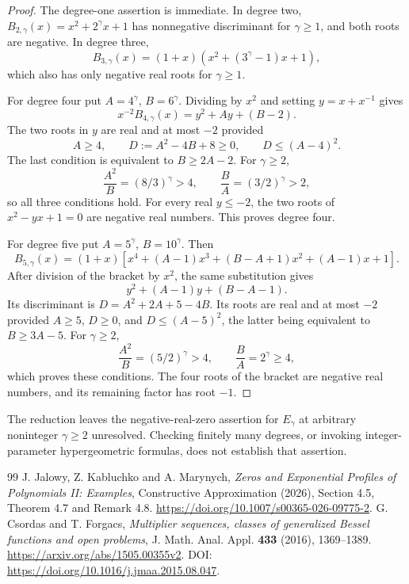 \documentclass[11pt,a4paper]{article}
\theoremstyle{remark}
\begin{document}
\begin{proof}
The degree-one assertion is immediate.  In degree two,
$B_{2,\gamma}(x)=x^2+2^\gamma x+1$ has nonnegative discriminant for
$\gamma\ge1$, and both roots are negative.  In degree three,
\[
 B_{3,\gamma}(x)=(1+x)\left(x^2+(3^\gamma-1)x+1\right),
\]
which also has only negative real roots for $\gamma\ge1$.

For degree four put $A=4^\gamma$, $B=6^\gamma$.  Dividing by $x^2$
and setting $y=x+x^{-1}$ gives
\[
 x^{-2}B_{4,\gamma}(x)=y^2+Ay+(B-2).
\]
The two roots in $y$ are real and at most $-2$ provided
\[
 A\ge4,\qquad D:=A^2-4B+8\ge0,
 \qquad D\le(A-4)^2.
\]
The last condition is equivalent to $B\ge2A-2$.  For $\gamma\ge2$,
\[
 \frac{A^2}{B}=(8/3)^\gamma>4,
 \qquad \frac BA=(3/2)^\gamma>2,
\]
so all three conditions hold.  For every real $y\le-2$, the two roots
of $x^2-yx+1=0$ are negative real numbers.  This proves degree four.

For degree five put $A=5^\gamma$, $B=10^\gamma$.  Then
\[
 B_{5,\gamma}(x)
 =(1+x)\left[x^4+(A-1)x^3+(B-A+1)x^2+(A-1)x+1\right].
\]
After division of the bracket by $x^2$, the same substitution gives
\[
 y^2+(A-1)y+(B-A-1).
\]
Its discriminant is $D=A^2+2A+5-4B$.  Its roots are real and at most
$-2$ provided $A\ge5$, $D\ge0$, and
$D\le(A-5)^2$, the latter being equivalent to $B\ge3A-5$.
For $\gamma\ge2$,
\[
 \frac{A^2}{B}=(5/2)^\gamma>4,
 \qquad \frac BA=2^\gamma\ge4,
\]
which proves these conditions.  The four roots of the bracket are
negative real numbers, and its remaining factor has root $-1$.
\end{proof}

The reduction leaves the negative-real-zero assertion for $E_\gamma$
at arbitrary noninteger $\gamma\ge2$ unresolved.  Checking finitely many
degrees, or invoking integer-parameter hypergeometric formulas, does not
establish that assertion.

\begingroup\small
\begin{thebibliography}{99}
 J. Jalowy, Z. Kabluchko and A. Marynych, \emph{Zeros and Exponential Profiles of Polynomials II: Examples}, Constructive Approximation (2026), Section 4.5, Theorem 4.7 and Remark 4.8. \url{https://doi.org/10.1007/s00365-026-09775-2}.
 G. Csordas and T. Forgacs, \emph{Multiplier sequences, classes of generalized Bessel functions and open problems}, J. Math. Anal. Appl. \textbf{433} (2016), 1369--1389. \url{https://arxiv.org/abs/1505.00355v2}. DOI: \url{https://doi.org/10.1016/j.jmaa.2015.08.047}.
\end{thebibliography}
\endgroup
\end{document}
